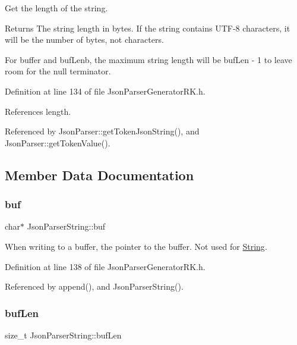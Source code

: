 Get the length of the string. 

\begin{DoxyReturn}{Returns}
The string length in bytes. If the string contains U\+T\+F-\/8 characters, it will be the number of bytes, not characters.
\end{DoxyReturn}
For buffer and buf\+Lenb, the maximum string length will be buf\+Len -\/ 1 to leave room for the null terminator. 

Definition at line 134 of file Json\+Parser\+Generator\+R\+K.\+h.



References length.



Referenced by Json\+Parser\+::get\+Token\+Json\+String(), and Json\+Parser\+::get\+Token\+Value().



\subsection{Member Data Documentation}
\mbox{\label{class_json_parser_string_a3ffd87df1aff38ff4142fad32e1e3de0}} 
\subsubsection{\texorpdfstring{buf}{buf}}
{\footnotesize\ttfamily char$\ast$ Json\+Parser\+String\+::buf\hspace{0.3cm}{\ttfamily [protected]}}



When writing to a buffer, the pointer to the buffer. Not used for \hyperlink{class_string}{String}. 



Definition at line 138 of file Json\+Parser\+Generator\+R\+K.\+h.



Referenced by append(), and Json\+Parser\+String().

\mbox{\label{class_json_parser_string_a376957bb37fc229f44d0d85ce74adb4a}} 
\subsubsection{\texorpdfstring{buf\+Len}{bufLen}}
{\footnotesize\ttfamily size\+\_\+t Json\+Parser\+String\+::buf\+Len\hspace{0.3cm}{\ttfamily [protected]}}




